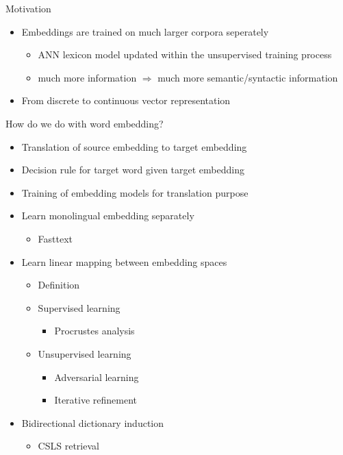 \documentclass[11pt, a4paper, landscape]{article}
\begin{document}
	\vfill


	
	\NewPage
	\vfill
	Motivation
	\begin{itemize}
		\item Embeddings are trained on much larger corpora seperately
		\begin{itemize}
			\item ANN lexicon model updated within the unsupervised training process
			\item much more information ${\Rightarrow}$ much more semantic/syntactic information
		\end{itemize}
		
		\item From discrete to continuous vector representation\\
		
	\end{itemize}
	How do we do with word embedding?
	\begin{itemize}
		\item Translation of source embedding to target embedding
		\item Decision rule for target word given target embedding
		\item Training of embedding models for translation purpose
	\end{itemize}
	\vfill

	\NewPage
	\vfill
	\begin{itemize}
		\item Learn monolingual embedding separately
			\begin{itemize}
				\item Fasttext 
			\end{itemize}
		\item Learn linear mapping between embedding spaces	
			\begin{itemize}
				\item Definition
				\item Supervised learning
					\begin{itemize}
						\item Procrustes analysis
					\end{itemize}
				\item Unsupervised learning
					\begin{itemize}
						\item Adversarial learning
						\item Iterative refinement
					\end{itemize}
			\end{itemize}
		\item Bidirectional dictionary induction
			\begin{itemize}
				\item CSLS retrieval 
			\end{itemize}
	\end{itemize}
	\vfill
	
\end{document}
